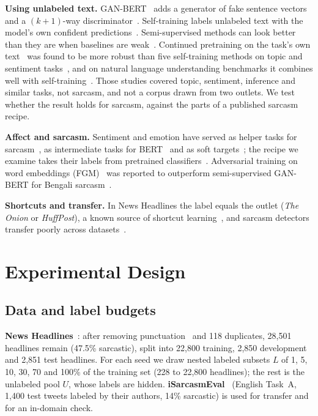 \documentclass[conference]{IEEEtran}
\begin{document}
\textbf{Using unlabeled text.} GAN-BERT~\cite{croce2020ganbert} adds a generator of fake sentence vectors and a $(k{+}1)$-way discriminator~\cite{salimans2016improved}. Self-training labels unlabeled text with the model's own confident predictions~\cite{lee2013pseudo}. Semi-supervised methods can look better than they are when baselines are weak~\cite{oliver2018realistic}. Continued pretraining on the task's own text~\cite{gururangan2020dont} was found to be more robust than five self-training methods on topic and sentiment tasks~\cite{shi2023rethinking}, and on natural language understanding benchmarks it combines well with self-training~\cite{li2021tapt}. Those studies covered topic, sentiment, inference and similar tasks, not sarcasm, and not a corpus drawn from two outlets. We test whether the result holds for sarcasm, against the parts of a published sarcasm recipe.

\textbf{Affect and sarcasm.} Sentiment and emotion have served as helper tasks for sarcasm~\cite{chauhan2020sentiment}, as intermediate tasks for BERT~\cite{savini2022intermediate} and as soft targets~\cite{chen2022jointly}; the recipe we examine takes their labels from pretrained classifiers~\cite{barbieri2020tweeteval,demszky2020goemotions}. Adversarial training on word embeddings (FGM)~\cite{miyato2017adversarial} was reported to outperform semi-supervised GAN-BERT for Bengali sarcasm~\cite{zihan2026fgm}.

\textbf{Shortcuts and transfer.} In News Headlines the label equals the outlet (\textit{The Onion} or \textit{HuffPost}), a known source of shortcut learning~\cite{gururangan2018annotation,geirhos2020shortcut}, and sarcasm detectors transfer poorly across datasets~\cite{jang2024generalizable}.

\section{Experimental Design}

\subsection{Data and label budgets}
\textbf{News Headlines}~\cite{misra2023sarcasm}: after removing punctuation~\cite{irfan2025seed} and 118 duplicates, 28,501 headlines remain (47.5\% sarcastic), split into 22,800 training, 2,850 development and 2,851 test headlines. For each seed we draw nested labeled subsets $L$ of 1, 5, 10, 30, 70 and 100\% of the training set (228 to 22,800 headlines); the rest is the unlabeled pool $U$, whose labels are hidden. \textbf{iSarcasmEval}~\cite{abufarha2022semeval} (English Task~A, 1,400 test tweets labeled by their authors, 14\% sarcastic) is used for transfer and for an in-domain check.
\end{document}
